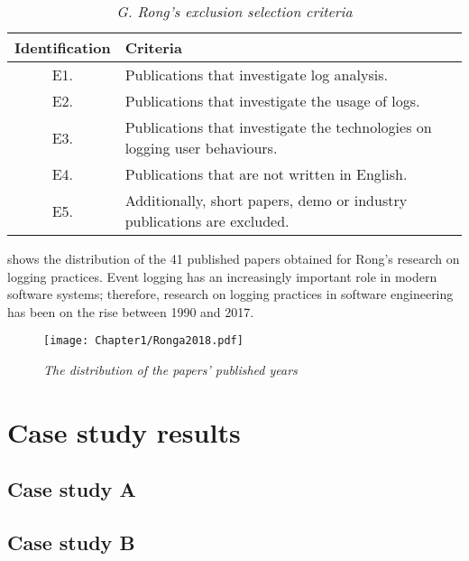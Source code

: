 \begin{table}[!htb]
	\centering
	\caption[G. Rong's exclusion selection criteria]
	{\textit{G. Rong's exclusion selection criteria \cite{Rong2018a}}}
	\label{tbl:CH1_RongExlSelectionCriteria}
	\begin{tabularx}{\textwidth}{|c|X|}
		\hline \textbf{Identification} & \textbf{Criteria} \\
		\hline E1. & Publications that investigate log analysis. \\
		\hline E2. & Publications that investigate the usage of logs. \\
		\hline E3. & Publications that investigate the technologies on logging user behaviours. \\
		\hline E4. & Publications that are not written in English. \\
		\hline E5. & Additionally, short papers, demo or industry publications are excluded. \\
		\hline
	\end{tabularx}
\end{table}

\clearpage

 shows the distribution of the 41 published papers obtained for Rong's research on logging practices. Event logging has an increasingly important role in modern software systems; therefore, research on logging practices in software engineering has been on the rise between 1990 and 2017.

\begin{figure}[!htb] %
	\centering %
	\texttt{[image: Chapter1/Ronga2018.pdf]}
	\caption[The distribution of the papers’ published years]
	{\textit{The distribution of the papers’ published years \cite{Rong2018a}}} \label{fig:PushblisedPapers}
\end{figure} 

\chapter{Case study results}\label{apx:caseStudies}
\section{Case study A}



\begin{landscape}
	
\end{landscape}

\section{Case study B}



\begin{landscape}
	
\end{landscape}
